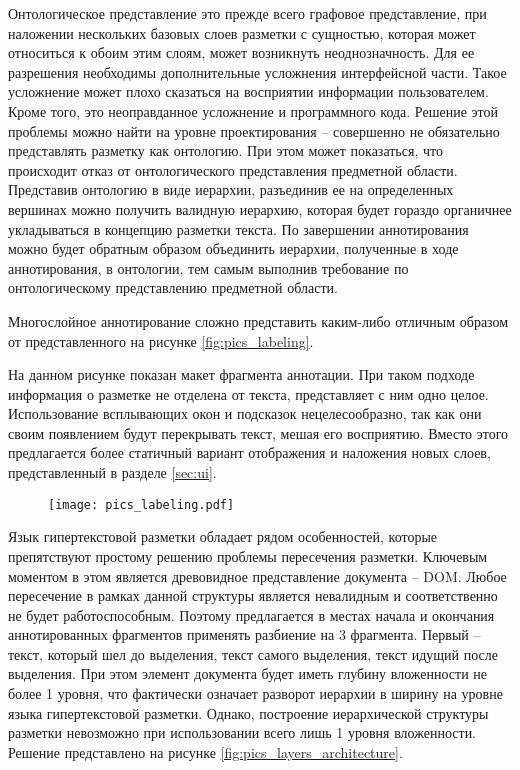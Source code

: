 \documentclass[../main]{subfiles}
\begin{document}
Онтологическое представление это прежде всего графовое представление, при наложении нескольких базовых слоев разметки с сущностью, которая может относиться к обоим этим слоям, может возникнуть неоднозначность. Для ее разрешения необходимы дополнительные усложнения интерфейсной части. Такое усложнение может плохо сказаться на восприятии информации пользователем. Кроме того, это неоправданное усложнение и программного кода. Решение этой проблемы можно найти на уровне проектирования -- совершенно не обязательно представлять разметку как онтологию. При этом может показаться, что происходит отказ от онтологического представления предметной области. Представив онтологию в виде иерархии, разъединив ее на определенных вершинах можно получить валидную иерархию, которая будет гораздо органичнее укладываться в концепцию разметки текста. По завершении аннотирования можно будет обратным образом объединить иерархии, полученные в ходе аннотирования, в онтологии, тем самым выполнив требование по онтологическому представлению предметной области.

Многослойное аннотирование сложно представить каким-либо отличным образом от представленного на рисунке \ref{fig:pics_labeling}. 

На данном рисунке показан макет фрагмента аннотации. При таком подходе информация о разметке не отделена от текста, представляет с ним одно целое. Использование всплывающих окон и подсказок нецелесообразно, так как они своим появлением будут перекрывать текст, мешая его восприятию. Вместо этого предлагается более статичный вариант отображения и наложения новых слоев, представленный в разделе \ref{sec:ui}.

\begin{figure}[H]
    \centering
    {\texttt{[image: pics\_labeling.pdf]}}
    \vspace{-\baselineskip}
\end{figure}

Язык гипертекстовой разметки обладает рядом особенностей, которые препятствуют простому решению проблемы пересечения разметки. Ключевым моментом в этом является древовидное представление документа -- DOM. Любое пересечение в рамках данной структуры является невалидным и соответственно не будет работоспособным. Поэтому предлагается в местах начала и окончания аннотированных фрагментов применять разбиение на 3 фрагмента. Первый -- текст, который шел до выделения, текст самого выделения, текст идущий после выделения. При этом элемент документа будет иметь глубину вложенности не более 1 уровня, что фактически означает разворот иерархии в ширину на уровне языка гипертекстовой разметки. Однако, построение иерархической структуры разметки невозможно при использовании всего лишь 1 уровня вложенности. Решение представлено на рисунке \ref{fig:pics_layers_architecture}.
\end{document}
